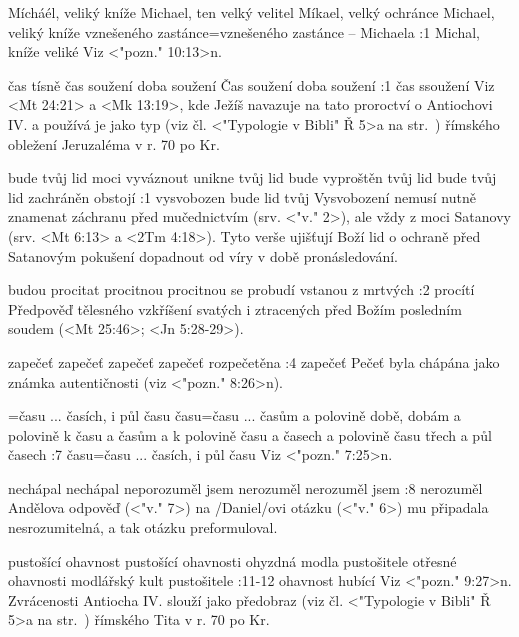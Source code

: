     {Mícháél, veliký kníže} %
    {Michael, ten velký velitel}  %
    {Míkael, velký ochránce} %
    {Michael, veliký kníže}  %
    {vznešeného zastánce}={vznešeného zastánce -- Michaela}  %
:1 {Michal, kníže veliké} Viz <"pozn." 10:13>n.

    {čas tísně} %
    {čas soužení}  %
    {doba soužení} %
    {Čas soužení}  %
    {doba soužení}  %
:1 {čas ssoužení} 
      Viz <Mt 24:21> a <Mk 13:19>, kde Ježíš navazuje na tato proroctví o Antiochovi IV. a používá je jako typ (viz čl. <"Typologie v Bibli" Ř 5>a na str.~\pg) římského obležení Jeruzaléma v r. 70 po Kr. 
      
    {bude tvůj lid moci vyváznout} %
    {unikne tvůj lid}  %
    {bude vyproštěn tvůj lid} %
    {bude tvůj lid zachráněn}  %
    {obstojí}  %
:1 {vysvobozen bude lid tvůj} Vysvobození nemusí nutně znamenat záchranu před  mučednictvím (srv. <"v." 2>), ale vždy z moci Satanovy (srv. <Mt 6:13> a <2Tm 4:18>). Tyto verše ujišťují Boží lid o ochraně před Satanovým pokušení dopadnout od víry v době pronásledování. 

    {budou procitat} %
    {procitnou}  %
    {procitnou} %
    {se probudí}  %
    {vstanou z mrtvých}  %
:2 {procítí} Předpověď tělesného vzkříšení svatých i ztracených před Božím posledním soudem (<Mt 25:46>; <Jn 5:28-29>).

    {zapečeť} %
    {zapečeť}  %
    {zapečeť} %
    {zapečeť}  %
    {rozpečetěna}  %
:4 {zapečeť} Pečeť byla chápána jako známka autentičnosti (viz <"pozn." 8:26>n).

={času ... časích, i půl času}  %
    {času}={času ... časům a polovině} %
    {době, dobám a polovině}  %
    {k času a časům a k polovině} %
    {času a časech a polovině času}  %
    {třech a půl časech}  %
:7 {času}={času ... časích, i půl času} Viz <"pozn." 7:25>n.


    {nechápal} %
    {nechápal}  %
    {neporozuměl jsem} %
    {nerozuměl}  %
    {nerozuměl jsem}  %
:8 {nerozuměl} Andělova odpověď (<"v." 7>) na \x/Daniel/ovi otázku (<"v." 6>) mu připadala nesrozumitelná, a tak otázku preformuloval. 


    {pustošící ohavnost} %
    {pustošící ohavnosti}  %
    {ohyzdná modla pustošitele} %
    {otřesné ohavnosti}  %
    {modlářský kult pustošitele}  %
:11-12 {ohavnost hubící} Viz <"pozn." 9:27>n. Zvrácenosti Antiocha IV. slouží jako předobraz (viz čl. <"Typologie v Bibli" Ř 5>a na str.~\pg) římského Tita v r. 70 po Kr. 
 

